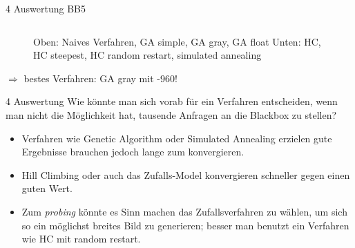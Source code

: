\documentclass{ocbeameruni}
\begin{document}
\begin{frame}{4 Auswertung BB5}
\begin{center}
\begin{figure}
\begin{tabular}{|c|c|c|c|}
    \end{tabular}
    \caption{Oben: Naives Verfahren, GA simple, GA gray, GA float \hspace{\textwidth}Unten: HC, HC steepest, HC random restart, simulated annealing}
    \end{figure}
    $\Rightarrow$ bestes Verfahren: GA gray mit -960!
    \end{center}
\end{frame}

\begin{frame}{4 Auswertung}
Wie könnte man sich vorab für ein Verfahren entscheiden, wenn man nicht die Möglichkeit hat,
tausende Anfragen an die Blackbox zu stellen?
    \begin{itemize}
    \item Verfahren wie Genetic Algorithm oder Simulated Annealing erzielen gute Ergebnisse brauchen jedoch lange zum konvergieren.
    \item Hill Climbing oder auch das Zufalls-Model konvergieren schneller gegen einen guten Wert.
    \item Zum \textit{probing} könnte es Sinn machen das Zufallsverfahren zu wählen, um sich so ein möglichst breites Bild zu generieren;
    besser man benutzt ein Verfahren wie HC mit random restart.
    \end{itemize}
\end{frame}
\end{document}
